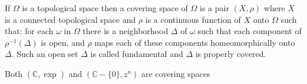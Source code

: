 If $\Omega$ is a topological space then a covering space of $\Omega$ is a pair $(X, \rho)$ where $X$ is a connected topological space and $\rho$ is a continuous function of $X$ onto $\Omega$ such that: for each $\omega$ in $\Omega$ there is a neighborhood $\Delta$ of $\omega$ such that each component of $\rho^{-1}(\Delta)$ is open, and $\rho$ maps each of these components homeomorphically onto $\Delta$. Such an open set $\Delta$ is called fundamental and $\Delta$ is properly covered.

Both $(\mathbb{C}, \exp)$ and $(\mathbb{C} - \{0\}, z^n)$ are covering spaces
